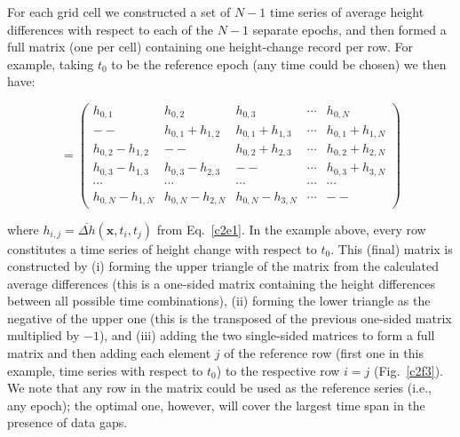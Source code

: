 For each grid cell we constructed a set of $N-1$ time series of average height differences with respect to each of the $N-1$ separate epochs, and then formed a full matrix (one per cell) containing one height-change record per row. For example, taking $t_0$ to be the reference epoch (any time could be chosen) we then have:

\begin{equation}
  [\Delta h] = 
  \begin{pmatrix}
    h_{0,1} & h_{0,2} & h_{0,3} & \cdots & h_{0,N} \\
    -- & h_{0,1} + h_{1,2} & h_{0,1} + h_{1,3} & \cdots & h_{0,1} + h_{1,N} \\
    h_{0,2} - h_{1,2} & -- & h_{0,2} + h_{2,3} & \cdots & h_{0,2} + h_{2,N} \\
    h_{0,3} - h_{1,3} & h_{0,3} - h_{2,3} & -- & \cdots & h_{0,3} + h_{3,N} \\
    \cdots & \cdots & \cdots & \cdots & \cdots \\
    h_{0,N} - h_{1,N} & h_{0,N} - h_{2,N} & h_{0,N} - h_{3,N} & \cdots & --
  \end{pmatrix}
  \label{c2e2}
\end{equation}

\noindent
where $h_{i,j} = \overbar{\Delta h}(\mathbf{x}, t_i, t_j)$ from Eq.~\ref{c2e1}. In the example above, every row constitutes a time series of height change with respect to $t_0$. This (final) matrix is constructed by (i) forming the upper triangle of the matrix from the calculated average differences (this is a one-sided matrix containing the height differences between all possible time combinations), (ii) forming the lower triangle as the negative of the upper one (this is the transposed of the previous one-sided matrix multiplied by $-1$), and (iii) adding the two single-sided matrices to form a full matrix and then adding each element $j$ of the reference row (first one in this example, time series with respect to $t_0$) to the respective row $i = j$ (Fig.~\ref{c2f3}). We note that any row in the matrix could be used as the reference series (i.e., any epoch); the optimal one, however, will cover the largest time span in the presence of data gaps.


